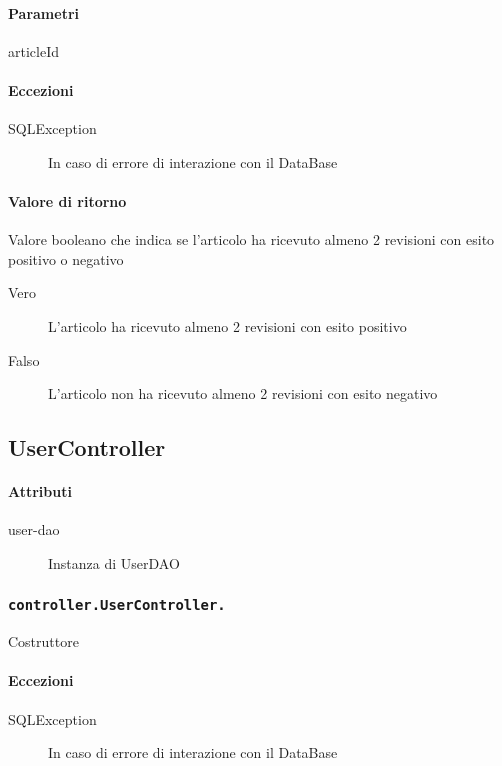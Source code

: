 \paragraph{Parametri}
\begin{description}
\item articleId
\end{description}
\paragraph{Eccezioni}
\begin{description}
\item[SQLException] In caso di errore di interazione con il DataBase
\end{description}
\paragraph{Valore di ritorno}
Valore booleano che indica se l'articolo ha ricevuto almeno 2 revisioni con esito positivo o negativo
\begin{description}
\item[Vero] L'articolo ha ricevuto almeno 2 revisioni con esito positivo 
\item[Falso] L'articolo non ha ricevuto almeno 2 revisioni con esito negativo
\end{description}

\subsection{UserController}
\paragraph{Attributi}
\begin{description}
\item[user-dao] Instanza di UserDAO
\end{description}

\subsubsection{\texttt{controller.UserController.}}
Costruttore
\paragraph{Eccezioni}
\begin{description}
\item[SQLException] In caso di errore di interazione con il DataBase
\end{description}

